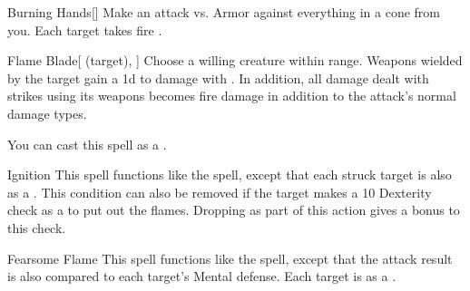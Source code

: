 \lowercase{\hypertarget{spell:Burning Hands}{}}\label{spell:Burning Hands}
\begin{ability}[\nth{2}]{\hypertarget{spell:Burning Hands}{Burning Hands}}[]
Make an attack vs. Armor against everything in a \arealarge cone from you.
\hit Each target takes fire .
\end{ability}
\vspace{0.25em}



\lowercase{\hypertarget{spell:Flame Blade}{}}\label{spell:Flame Blade}
\begin{ability}[\nth{2}]{\hypertarget{spell:Flame Blade}{Flame Blade}}[ (target), ]
Choose a willing creature within \rngclose range.
Weapons wielded by the target gain a \plus1d  to damage with .
In addition, all damage dealt with strikes using its weapons becomes fire damage in addition to the attack's normal damage types.

You can cast this spell as a .
\end{ability}
\vspace{0.25em}



\lowercase{\hypertarget{spell:Ignition}{}}\label{spell:Ignition}
\begin{ability}[\nth{2}]{\hypertarget{spell:Ignition}{Ignition}}
This spell functions like the  spell, except that each struck target is also  as a .
This condition can also be removed if the target makes a  10 Dexterity check as a  to put out the flames.
Dropping  as part of this action gives a  bonus to this check.
\end{ability}
\vspace{0.25em}



\lowercase{\hypertarget{spell:Fearsome Flame}{}}\label{spell:Fearsome Flame}
\begin{ability}[\nth{3}]{\hypertarget{spell:Fearsome Flame}{Fearsome Flame}}
This spell functions like the  spell, except that the attack result is also compared to each target's Mental defense.
\hit Each target is  as a .
\end{ability}
\vspace{0.25em}




